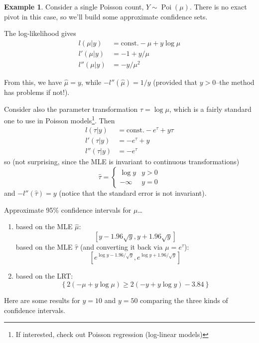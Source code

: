 \documentclass[
]{book}
\providecommand{\tightlist}{%
  \setlength{\itemsep}{0pt}\setlength{\parskip}{0pt}}
\DeclareMathOperator{\Pois}{Poi}
\newcommand{\const}{\text{const.}}
\theoremstyle{definition}
\theoremstyle{definition}
\newtheorem{example}{Example}[chapter]
\theoremstyle{definition}
\theoremstyle{definition}
\theoremstyle{remark}
\begin{document}
\begin{example}

Consider a single Poisson count, \(Y\sim\Pois(\mu)\). There is no exact pivot in this case, so we'll build some approximate confidence sets.

The log-likelihood gives
\begin{align*}
l(\mu|y) &= \const - \mu + y \log\mu \\
l'(\mu|y) &= -1 +y/\mu \\
l''(\mu|y) &= -y/\mu^2 
\end{align*}

From this, we have \(\hat\mu=y\), while \(-l''(\hat\mu)=1/y\) (provided that \(y>0\)--the method has problems if not!).

Consider also the parameter transformation \(\tau = \log \mu\), which is a fairly standard one to use in Poisson models\footnote{If interested, check out Poisson regression (log-linear models)}. Then
\begin{align*}
l(\tau|y) &= \const - e^\tau + y \tau \\
l'(\tau|y) &= - e^\tau  +y \\
l''(\tau|y) &= - e^\tau
\end{align*}
so (not surprising, since the MLE is invariant to continuous transformations)
\[
\hat\tau = \begin{cases}
\log y & y > 0 \\
-\infty &y=0
\end{cases}
\]
and \(-l''(\hat\tau)=y\) (notice that the standard error is not invariant).

Approximate 95\% confidence intervals for \(\mu\)\ldots{}

\begin{enumerate}
\def\labelenumi{(\alph{enumi})}
\tightlist
\item
  based on the MLE \(\hat\mu\):
  \[
  [y-1.96\sqrt y, y+1.96\sqrt y]
  \]
  based on the MLE \(\hat\tau\) (and converting it back via \(\mu = e^\tau\)):
  \[
  [e^{\log y - 1.96 / \sqrt y}, e^{\log y + 1.96 / \sqrt y}]
  \]
\item
  based on the LRT:
  \[
  \left\{ 2(-\mu + y \log\mu) \geq 2(-y +y\log y) - 3.84 \right\}
  \]
\end{enumerate}

\end{example}

Here are some results for \(y=10\) and \(y=50\) comparing the three kinds of confidence intervals.
\end{document}
